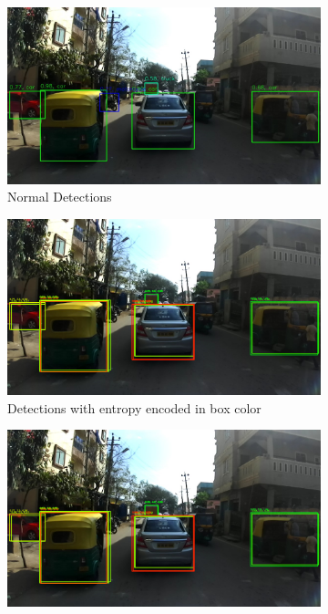     \begin{figure}[H]
    	\centering
    	\begin{subfigure}[t]{0.495\textwidth}
    		\centering
    		\includegraphics[width=\textwidth]{images/det_images/idd_1.jpg}
    		\caption{Normal Detections}
    	\end{subfigure}
    	\begin{subfigure}[t]{0.495\textwidth}
    		\centering
    		\includegraphics[width=\textwidth]{images/det_images/idd_bnn_entropies_1.png}
    		\caption{Detections with entropy encoded in box color}
    	\end{subfigure}
    	\begin{subfigure}[t]{0.495\textwidth}
    		\centering
    		\includegraphics[width=\textwidth]{images/det_images/idd_bnn_variances_1.png}

\end{subfigure}
\end{figure}
